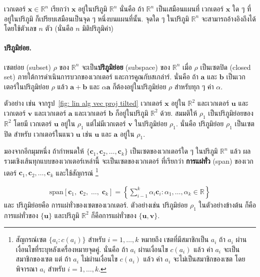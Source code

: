 เวกเตอร์ $\bm{x} \in \mathbb{R}^n$ 
เรียกว่า $\bm{x}$ อยู่ในปริภูมิ $\mathbb{R}^n$
นั่นคือ ถ้า $\mathbb{R}^n$ เป็นเสมือนแผนที่
เวกเตอร์ $\bm{x}$ ใด ๆ ที่อยู่ในปริภูมิ 
ก็เปรียบเสมือนเป็นจุด ๆ หนึ่งบนแผนที่นั้น.
จุดใด ๆ ในปริภูมิ 
$\mathbb{R}^n$
จะสามารถอ้างอิงถึงได้โดยใช้ตัวเลข $n$ ตัว (นั่นคือ $n$ มิติปริภูมิค่า)

\paragraph{ปริภูมิย่อย.}
เซตย่อย (subset) $\rho$ ของ $\mathbb{R}^n$
จะเป็น\textbf{ปริภูมิย่อย} (subspace) ของ $\mathbb{R}^n$
เมื่อ $\rho$ เป็นเซตปิด (closed set) 
ภายใต้การดำเนินการบวกของเวกเตอร์ และการคูณกับสเกล่าร์.
นั่นคือ ถ้า $\bm{a}$ และ $\bm{b}$ เป็นเวกเตอร์ในปริภูมิย่อย $\rho$ แล้ว
$\bm{a} + \bm{b}$
และ $\alpha \bm{a}$ ก็ต้องอยู่ในปริภูมิย่อย $\rho$ สำหรับทุก  ๆ ค่า $\alpha$.

ตัวอย่าง เช่น จากรูป~\ref{fig: lin alg vec proj tilted}
เวกเตอร์ $\bm{x}$ อยู่ใน $\mathbb{R}^2$
และเวกเตอร์
$\bm{u}$
และเวกเตอร์
$\bm{v}$
และเวกเตอร์
$\bm{a}$
และเวกเตอร์
$\bm{b}$
ก็อยู่ในปริภูมิ $\mathbb{R}^2$ ด้วย.
%
สมมติให้
$\rho_1$ เป็นปริภูมิย่อยของ $\mathbb{R}^2$
โดยมี
เวกเตอร์ $\bm{u}$ อยู่ใน $\rho_1$
แต่ไม่มีเวกเตอร์ $\bm{v}$ 
ในปริภูมิย่อย $\rho_1$.
นั่นคือ
ปริภูมิย่อย $\rho_1$ เป็นเซตปิด
สำหรับ เวกเตอร์ในแนว $\bm{u}$
เช่น $\bm{u}$ และ $\bm{a}$ อยู่ใน $\rho_1$.

มองจากอีกมุมหนึ่ง 
ถ้ากำหนดให้ $\{\bm{c}_1,
\bm{c}_2, \ldots, \bm{c}_k\}$ เป็นเซตของเวกเตอร์ใด ๆ ในปริภูมิ $\mathbb{R}^n$ แล้ว 
ผลรวมเชิงเส้นทุกแบบของเวกเตอร์เหล่านี้ จะเป็นเซตของเวกเตอร์ ที่เรียกว่า \textbf{การแผ่ทั่ว} (span)
ของเวกเตอร์ $\bm{c}_1,
\bm{c}_2, \ldots, \bm{c}_k$ 
และใช้สัญกรณ์%
\footnote{%
สัญกรณ์เซต $\{a_i : c(a_i) \}$ สำหรับ $i = 1, \ldots, k$ หมายถึง เซตที่มีสมาชิกเป็น $a_i$ ถ้า $a_i$ ผ่านเงื่อนไขที่ระบุหลังเครื่องหมายจุดคู่.
นั่นคือ ถ้า $a_i$ ผ่านเงื่อนไข $c(a_i)$ แล้ว
ค่า $a_i$ จะเป็นสมาชิกของเซต
แต่
ถ้า $a_i$ ไม่ผ่านเงื่อนไข $c(a_i)$ แล้ว ค่า $a_i$ จะไม่เป็นสมาชิกของเซต
โดยพิจารณา $a_i$ สำหรับ $i = 1, \ldots, k$.
}

\begin{eqnarray}
\mathrm{span}[\bm{c}_1, \; \bm{c}_2, \; \ldots, \; \bm{c}_k] 
=
\left\{
\sum_{i-1}^k 
\alpha_i \bm{c}_i
:
\alpha_1, \ldots, \alpha_k \in \mathbb{R}
\right\}
\end{eqnarray}
และ
ปริภูมิย่อยคือ การแผ่ทั่วของเซตของเวกเตอร์.
ตัวอย่างเช่น 
ปริภูมิย่อย $\rho_1$ ในตัวอย่างข้างต้น ก็คือการแผ่ทั่วของ $\{\bm{u}\}$
และปริภูมิ $\mathbb{R}^2$ 
ก็คือการแผ่ทั่วของ 
$\{\bm{u}, \bm{v}\}$.

